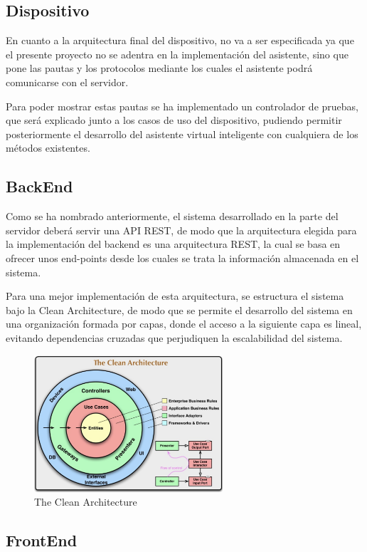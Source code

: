 \subsection{Dispositivo}

En cuanto a la arquitectura final del dispositivo, no va a ser especificada ya que el presente proyecto no se adentra en la implementación del asistente, sino que pone las pautas y los protocolos mediante los cuales el asistente podrá comunicarse con el servidor.

Para poder mostrar estas pautas se ha implementado un controlador de pruebas, que será explicado junto a los casos de uso del dispositivo, pudiendo permitir posteriormente el desarrollo del asistente virtual inteligente con cualquiera de los métodos existentes.

\subsection{BackEnd} \label{arch-be}

Como se ha nombrado anteriormente, el sistema desarrollado en la parte del servidor deberá servir una API REST, de modo que la arquitectura elegida para la implementación del backend es una arquitectura REST, la cual se basa en ofrecer unos end-points desde los cuales se trata la información almacenada en el sistema.

Para una mejor implementación de esta arquitectura, se estructura el sistema bajo la Clean Architecture, de modo que se permite el desarrollo del sistema en una organización formada por capas, donde el acceso a la siguiente capa es lineal, evitando dependencias cruzadas que perjudiquen la escalabilidad del sistema.

\begin{figure}[h!]
    \centering
    \includegraphics[width=7cm]{./img/arch/cleanarch.png}
    \caption{The Clean Architecture}
    \label{fig:cleanarch}
\end{figure}

\subsection{FrontEnd}

